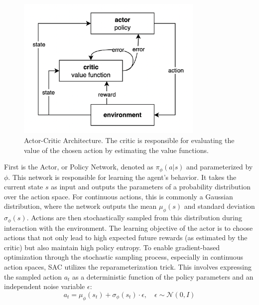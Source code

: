 \begin{figure}
\centering
\includegraphics[width=0.8\textwidth]{images/AC_architecture.png}
\caption{Actor-Critic Architecture. The critic is responsible for evaluating the value of the chosen action by estimating the value functions.}
\label{fig:AC}
\end{figure}

First is the Actor, or Policy Network, denoted as \(\pi_\phi(a|s)\) and parameterized by \(\phi\). This network is responsible for learning the agent's behavior. It takes the current state \(s\) as input and outputs the parameters of a probability distribution over the action space. For continuous actions, this is commonly a Gaussian distribution, where the network outputs the mean \(\mu_\phi(s)\) and standard deviation \(\sigma_\phi(s)\). Actions are then stochastically sampled from this distribution during interaction with the environment. The  learning objective of the actor is to choose actions that not only lead to high expected future rewards (as estimated by the critic) but also maintain high policy entropy. To enable gradient-based optimization through the stochastic sampling process, especially in continuous action spaces, \gls{SAC} utilizes the reparameterization trick. This involves expressing the sampled action \(a_t\) as a deterministic function of the policy parameters and an independent noise variable \(\epsilon\):
\[a_t = \mu_\phi(s_t) + \sigma_\phi(s_t) \cdot \epsilon, \quad \epsilon \sim \mathcal{N}(0,I)\]

